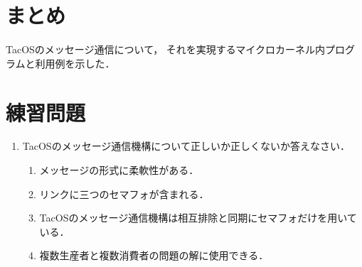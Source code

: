 \section{まとめ}
TacOSのメッセージ通信について，
それを実現するマイクロカーネル内プログラムと利用例を示した．

\section*{練習問題}
\begin{enumerate}
  \renewcommand{\labelenumi}{\ttfamily\arabic{chapter}.\arabic{enumi}}
  \setlength{\leftskip}{1em}
\item TacOSのメッセージ通信機構について正しいか正しくないか答えなさい．
  \begin{enumerate}
  \item メッセージの形式に柔軟性がある．
  \item リンクに三つのセマフォが含まれる．
  \item TacOSのメッセージ通信機構は相互排除と同期にセマフォだけを用いている．
  \item 複数生産者と複数消費者の問題の解に使用できる．
  \end{enumerate}
\end{enumerate}
